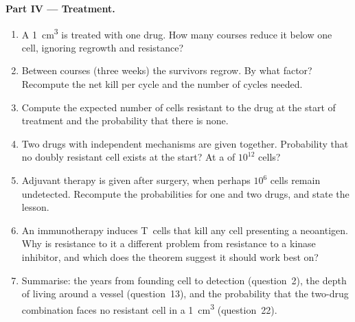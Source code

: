 \begin{problem}
\medskip
\noindent\textbf{Part IV --- Treatment.}
\begin{enumerate}[resume]
  \item A \qty{1}{cm^3}  is treated with one drug. How many
        courses reduce it below one cell, ignoring regrowth and
        resistance?
  \item Between courses (three weeks) the survivors regrow. By what
        factor? Recompute the net kill per cycle and the number of
        cycles needed.
  \item Compute the expected number of cells resistant to the drug at
        the start of treatment and the probability that there is none.
  \item Two drugs with independent mechanisms are given together.
        Probability that no doubly resistant cell exists at the start?
        At a  of $10^{12}$ cells?
  \item Adjuvant therapy is given after surgery, when perhaps $10^{6}$
        cells remain undetected. Recompute the probabilities for one
        and two drugs, and state the lesson.
  \item An immunotherapy induces T~cells that kill any cell presenting
        a neoantigen. Why is resistance to it a different problem from
        resistance to a kinase inhibitor, and which  does the
        theorem suggest it should work best on?
  \item Summarise: the years from founding cell to detection
        (question~2), the depth of living  around a vessel
        (question~13), and the probability that the two-drug
        combination faces no resistant cell in a \qty{1}{cm^3} 
        (question~22).
\end{enumerate}
\end{problem}
